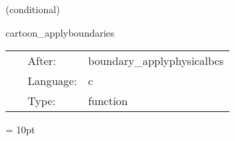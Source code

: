 \documentclass{article}
\begin{document}
\vspace{5mm}

   (conditional) 

\hspace{5mm} cartoon\_applyboundaries 

\hspace{5mm}{\it apply cartoon boundary conditions } 


\hspace{5mm}

 \begin{tabular*}{160mm}{cll} 
~ & After:  & boundary\_applyphysicalbcs \\ 
~ & Language:  & c \\ 
~ & Type:  & function \\ 
\end{tabular*} 



\vspace{5mm}\parskip = 10pt 
\end{document}
